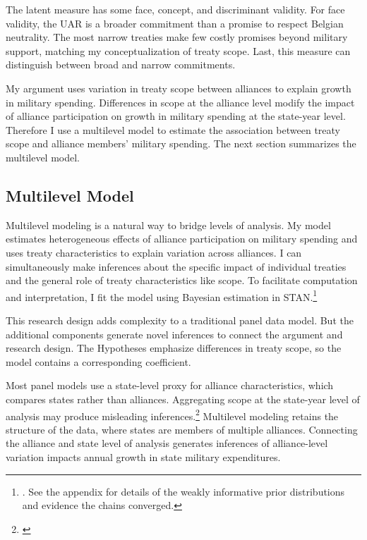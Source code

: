 \documentclass[12pt]{article}
\begin{document}
The latent measure has some face, concept, and discriminant validity. 
For face validity, the UAR is a broader commitment than a promise to respect Belgian neutrality. 
The most narrow treaties make few costly promises beyond military support, matching my conceptualization of treaty scope. 
Last, this measure can distinguish between broad and narrow commitments. 


My argument uses variation in treaty scope between alliances to explain growth in military spending.
Differences in scope at the alliance level modify the impact of alliance participation on growth in military spending at the state-year level. 
Therefore I use a multilevel model to estimate the association between treaty scope and alliance members' military spending.  
The next section summarizes the multilevel model. 


\subsection{Multilevel Model} 


Multilevel modeling is a natural way to bridge levels of analysis.
My model estimates heterogeneous effects of alliance participation on military spending and uses treaty characteristics to explain variation across alliances. 
I can simultaneously make inferences about the specific impact of individual treaties and the general role of treaty characteristics like scope. 
To facilitate computation and interpretation, I fit the model using Bayesian estimation in STAN.\footnote{\citep{Carpenteretal2016}. See the appendix for details of the weakly informative prior distributions and evidence the chains converged.}


This research design adds complexity to a traditional panel data model. 
But the additional components generate novel inferences to connect the argument and research design. 
The Hypotheses emphasize differences in treaty scope, so the model contains a corresponding coefficient.


Most panel models use a state-level proxy for alliance characteristics, which compares states rather than alliances.
Aggregating scope at the state-year level of analysis may produce misleading inferences.\footnote{\citep{McElreath2016}}
Multilevel modeling retains the structure of the data, where states are members of multiple alliances. 
Connecting the alliance and state level of analysis generates inferences of alliance-level variation impacts annual growth in state military expenditures. 
\end{document}
